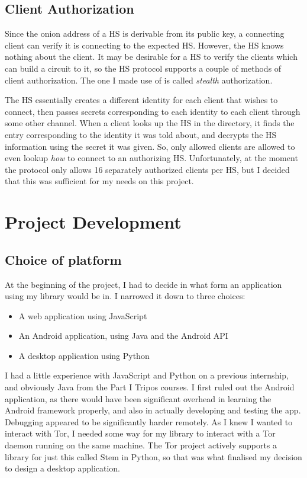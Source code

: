 \documentclass[diss.tex]{subfiles}
\begin{document}
\subsection{Client Authorization}

Since the onion address of a HS is derivable from its public key, a connecting client can verify it is connecting to the expected HS. However, the HS knows nothing about the client. It may be desirable for a HS to verify the clients which can build a circuit to it, so the HS protocol supports a couple of methods of client authorization. The one I made use of is called \textit{stealth} authorization.

The HS essentially creates a different identity for each client that wishes to connect, then passes secrets corresponding to each identity to each client through some other channel. When a client looks up the HS in the directory, it finds the entry corresponding to the identity it was told about, and decrypts the HS information using the secret it was given. So, only allowed clients are allowed to even lookup \textit{how} to connect to an authorizing HS. Unfortunately, at the moment the protocol only allows 16 separately authorized clients per HS, but I decided that this was sufficient for my needs on this project.

\section{Project Development}

\subsection{Choice of platform}
At the beginning of the project, I had to decide in what form an application using my library would be in. I narrowed it down to three choices:
\begin{itemize}
\item A web application using JavaScript
\item An Android application, using Java and the Android API
\item A desktop application using Python
\end{itemize}

I had a little experience with JavaScript and Python on a previous internship, and obviously Java from the Part I Tripos courses. I first ruled out the Android application, as there would have been significant overhead in learning the Android framework properly, and also in actually developing and testing the app. Debugging appeared to be significantly harder remotely. As I knew I wanted to interact with Tor, I needed some way for my library to interact with a Tor daemon running on the same machine. The Tor project actively supports a library for just this called Stem in Python, so that was what finalised my decision to design a desktop application.
\end{document}
